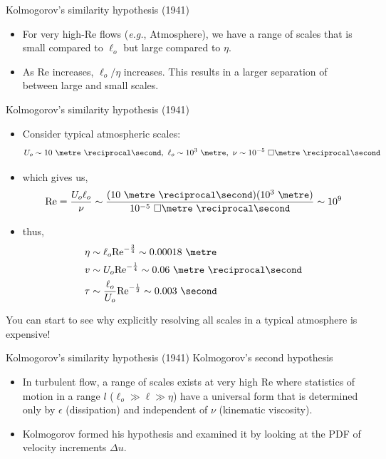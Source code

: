 
\begin{frame}{Kolmogorov's similarity hypothesis (1941)}
\begin{itemize}
	\item For very high-Re flows (\textit{e.g.}, Atmosphere), we have a range of scales that is small compared to $\ell_o$ but large compared to $\eta$.
	\item As Re increases, $\ell_o/\eta$ increases. This results in a larger separation of between large and small scales.
\end{itemize}
\end{frame}


\begin{frame}{Kolmogorov's similarity hypothesis (1941)}
\begin{itemize}
	\item Consider typical atmospheric scales:$$U_o\sim10\ \metre\ \reciprocal\second,\ \ell_o\sim10^3\ \metre,\ \nu \sim 10^{-5}\ \square\metre\ \reciprocal\second$$
	\item which gives us, $$\text{Re} = \frac{U_o \ell_o}{\nu} \sim \frac{(10\ \metre\ \reciprocal\second)(10^3\ \metre)}{10^{-5}\ \square\metre\ \reciprocal\second} \sim 10^9$$
	\item thus, 
	\begin{align*}
		\eta &\sim \ell_o \text{Re}^{-\frac{3}{4}} \sim 0.00018\ \metre \\
		v &\sim U_o \text{Re}^{-\frac{1}{4}} \sim 0.06\ \metre\ \reciprocal\second \\
		\tau &\sim \frac{\ell_o}{U_o} \text{Re}^{-\frac{1}{2}} \sim 0.003\ \second
	\end{align*}
\end{itemize}
You can start to see why explicitly resolving all scales in a typical atmosphere is expensive!
\end{frame}


\begin{frame}{Kolmogorov's similarity hypothesis (1941)}
	Kolmogorov's second hypothesis
	\begin{itemize}
		\item In turbulent flow, a range of scales exists at very high Re where statistics of motion in a range $l$ ($\ell_o \gg \ell \gg \eta$) have a universal form that is determined only by $\epsilon$ (dissipation) and independent of $\nu$ (kinematic viscosity).
		\item Kolmogorov formed his hypothesis and examined it by looking at the PDF of velocity increments $\Delta u$.
	\end{itemize}
\end{frame}

